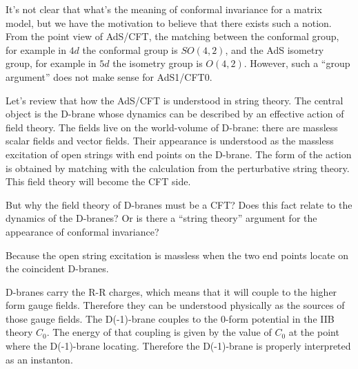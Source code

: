 
It's not clear that what's the meaning of conformal invariance for a matrix model, but we have the motivation to believe that there exists such a notion.
From the point view of AdS/CFT, the matching between the conformal group,
for example in $4d$ the conformal group is $SO(4,2)$, and the AdS isometry group, for example in $5d$ the isometry group is $O(4,2)$.
However, such a ``group argument'' does not make sense for AdS1/CFT0.

Let's review that how the AdS/CFT is understood in string theory.
The central object is the D-brane whose dynamics can be described by an effective action of field theory.
The fields live on the world-volume of D-brane: there are massless scalar fields and vector fields.
Their appearance is understood as the massless excitation of open strings with end points on the D-brane.
The form of the action is obtained by matching with the calculation from the perturbative string theory.
This field theory will become the CFT side.

\begin{question}
But why the field theory of D-branes must be a CFT? Does this fact relate to the dynamics of the D-branes? Or is there a ``string theory'' argument for the appearance of conformal invariance?
\end{question}

\begin{answer}
	Because the open string excitation is massless when the two end points locate on the coincident D-branes.
\end{answer}

D-branes carry the R-R charges, 
which means that it will couple to the higher form gauge fields.
Therefore they can be understood physically 
as the sources of those gauge fields.
The D(-1)-brane couples to the 0-form potential in the IIB theory $C_0$.
The energy of that coupling is given by the value of $C_0$ at the point where the D(-1)-brane locating.
Therefore the D(-1)-brane is properly interpreted as an instanton.

